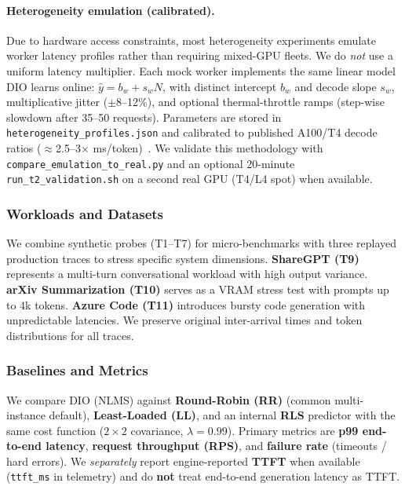 \documentclass[10pt,twocolumn,letterpaper]{article}
\begin{document}
\paragraph{Heterogeneity emulation (calibrated).}
Due to hardware access constraints, most heterogeneity experiments emulate worker latency profiles rather than requiring mixed-GPU fleets. We do \emph{not} use a uniform latency multiplier. Each mock worker implements the same linear model DIO learns online: $\hat{y} = b_w + s_w N$, with distinct intercept $b_w$ and decode slope $s_w$, multiplicative jitter ($\pm$8--12\%), and optional thermal-throttle ramps (step-wise slowdown after 35--50 requests). Parameters are stored in \texttt{heterogeneity\_profiles.json} and calibrated to published A100/T4 decode ratios ($\approx$2.5--3$\times$ ms/token)~\cite{nexussched}. We validate this methodology with \texttt{compare\_emulation\_to\_real.py} and an optional 20-minute \texttt{run\_t2\_validation.sh} on a second real GPU (T4/L4 spot) when available.

\subsubsection{Workloads and Datasets}
We combine synthetic probes (T1--T7) for micro-benchmarks with three replayed production traces to stress specific system dimensions. \textbf{ShareGPT (T9)} represents a multi-turn conversational workload with high output variance. \textbf{arXiv Summarization (T10)} serves as a VRAM stress test with prompts up to 4k tokens. \textbf{Azure Code (T11)} introduces bursty code generation with unpredictable latencies. We preserve original inter-arrival times and token distributions for all traces.

\subsubsection{Baselines and Metrics}
We compare DIO (NLMS) against \textbf{Round-Robin (RR)} (common multi-instance default), \textbf{Least-Loaded (LL)}, and an internal \textbf{RLS} predictor with the same cost function ($2{\times}2$ covariance, $\lambda{=}0.99$). Primary metrics are \textbf{p99 end-to-end latency}, \textbf{request throughput (RPS)}, and \textbf{failure rate} (timeouts / hard errors). We \emph{separately} report engine-reported \textbf{TTFT} when available (\texttt{ttft\_ms} in telemetry) and do \textbf{not} treat end-to-end generation latency as TTFT.
\end{document}
